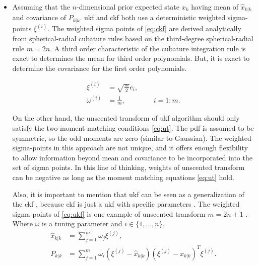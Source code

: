 \documentclass[12pt]{article}
\begin{document}
\begin{enumerate}[label=\arabic*)]
        \begin{itemize}
            \renewcommand\labelitemi{\tiny$\bullet$}
            \item  
                Assuming that the $n$-dimensional prior expected state $x_k$ having mean of $\hat{x}_{k|k}$ and covariance of $P_{k|k}$. \acrshort{ukf} and \acrshort{ckf} both use a deterministic weighted sigma-points $\xi^{(i)}$. The weighted sigma points of \eqref{eq:ckf} are derived analytically from spherical-radial cubature rules based on the third-degree spherical-radial rule $m=2n$. A third order characteristic of the cubature integration rule is exact to determines the mean for third order polynomials. But, it is exact to determine the covariance for the first order polynomials.
                
                \begin{subequations} \label{eq:ckf}
                \begin{align}
                \xi^{(i)} &= \sqrt{\frac{m}{2}} e_{i}, \\
                \omega^{(i)} &= \frac{1}{m}, \qquad \qquad i=1:m.
                \end{align} 
                \end{subequations}
                
                On the other hand, the unscented transform of \acrshort{ukf} algorithm should only satisfy the two moment-matching conditions \eqref{eq:ut}. The \acrshort{pdf} is assumed to be symmetric, so the odd moments are zero (similar to Gaussian). The weighted sigma-points in this approach are not unique, and it offers enough flexibility to allow information beyond mean and covariance to be incorporated into the set of sigma points. In this line of thinking, weights of unscented transform can be negative as long as the moment matching equations \eqref{eq:ut} hold.
                
                Also, it is important to mention that \acrshort{ukf} can be seen as a generalization of the \acrshort{ckf} , because \acrshort{ckf} is just a \acrshort{ukf} with specific parameters \cite{sarkka2013bayesian}. The weighted sigma points of \eqref{eq:ukf} is one example of unscented transform $m=2n+1$ \cite{julier2004unscented}. Where $\bar \omega$ is a tuning parameter and $i\in\{1,\dots,n\}$. 
                \begin{subequations} \label{eq:ut}
                \begin{align}
                     \hat{x}_{k|k} &= \sum_{j=1}^{m}  \omega_j \xi^{(j)},  \\
                    P_{k|k} &= \sum_{j=1}^{m} \omega_i (\xi^{(j)} - \hat{x}_{k|k})(\xi^{(j)} - \hat{x}_{k|k})^T \xi^{(j)}.
                \end{align}
                \end{subequations}
                

\end{itemize}
\end{enumerate}
\end{document}
